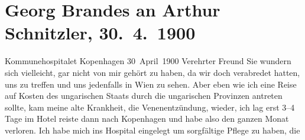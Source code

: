 

         
         \renewcommand{\erwaehntePersonen}{Personen: Honoré de Balzac, Richard Beer-Hofmann, Paul Bourget, Georg Brandes, Paul Goldmann, Theodor Gomperz, Ewelina Hańska, Wilhelm Hegeler, Karl Lanckoroński}
         \renewcommand{\erwaehnteInstitutionen}{Institutionen: Calmann-Lévy, Liberaler Club}
         \renewcommand{\erwaehnteOrte}{Orte: Deutschland, Frankreich, Kommunehospitalet, Kopenhagen, Skandinavien, Ungarn, Wien}
         \renewcommand{\erwaehnteWerke}{Werke: Ein Sommer in China. Reisebilder, Familiendramen, Ingenieur Horstmann, Lettres à l’étrangère (1833–1842), (1842–1844), Rund um die Erde 1888–89, Samlede Skrifter [Gesammelte Werke]}
               \section[Georg Brandes an Arthur Schnitzler, 30. 4. 1900]{ Georg Brandes an Arthur Schnitzler, 30. 4. 1900}\nopagebreak{}\rehead{ }\begin{ledgroupsized}[t]{13cm}\normalsize\beginnumbering \toendnotes[C]{\smallbreak\pagebreak[2]} 
\toendnotes[C]{\smallbreak}\pstart
           \raggedleft{}{\pb}Kommunehospitalet\pend
           \pstart
           \raggedleft{}Kopenhagen\pend
           \pstart
           \raggedleft{}30 April 1900\pend
           \pstart{}Verehrter Freund\pend\pstart
           Sie wundern sich vielleicht, gar nicht von mir gehört zu haben, da wir doch
               verabredet hatten, uns zu treffen und uns jedenfalls in Wien zu sehen. Aber eben wie ich eine Reise auf Kosten des ungarischen Staats durch die ungarischen Provinzen antreten sollte, kam meine alte Krankheit,
               die Venenentzündung, wieder, ich lag erst 3–4 Tage im Hotel reiste dann nach Kopenhagen und habe also den ganzen Monat
               verloren. Ich habe mich ins Hospital eingelegt um sorgfältige Pflege zu haben, die

\end{ledgroupsized}

